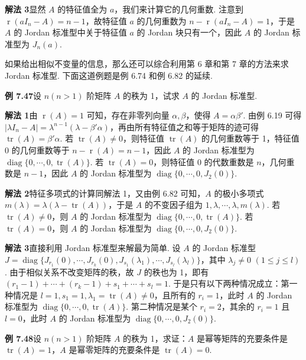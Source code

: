\documentclass[UTF8,12pt,a4paper,fontset=fandol]{ctexart}
\begin{document}
\noindent\textbf{解法 3}\quad 显然 $A$ 的特征值全为 $a$，我们来计算它的几何重数. 注意到 $\operatorname{r}(aI_n-A)=n-1$，故特征值 $a$ 的几何重数为 $n-\operatorname{r}(aI_n-A)=1$，于是 $A$ 的 Jordan 标准型中关于特征值 $a$ 的 Jordan 块只有一个，因此 $A$ 的 Jordan 标准型为 $J_n(a)$.

如果给出相似不变量的信息，那么还可以综合利用第 6 章和第 7 章的方法来求 Jordan 标准型. 下面这道例题是例 6.74 和例 6.82 的延续.

\noindent\textbf{例 7.47}\quad 设 $n(n>1)$ 阶矩阵 $A$ 的秩为 1，试求 $A$ 的 Jordan 标准型.

\noindent\textbf{解法 1}\quad 由 $\operatorname{r}(A)=1$ 可知，存在非零列向量 $\alpha,\beta$，使得 $A=\alpha\beta'$. 由例 6.19 可得 $|\lambda I_n-A|=\lambda^{n-1}(\lambda-\beta'\alpha)$，再由所有特征值之和等于矩阵的迹可得 $\operatorname{tr}(A)=\beta'\alpha$. 若 $\operatorname{tr}(A)\ne 0$，则特征值 $\operatorname{tr}(A)$ 的几何重数等于 1，特征值 $0$ 的几何重数等于 $n-\operatorname{r}(A)=n-1$，因此 $A$ 的 Jordan 标准型为 $\operatorname{diag}\{0,\cdots,0,\operatorname{tr}(A)\}$. 若 $\operatorname{tr}(A)=0$，则特征值 $0$ 的代数重数是 $n$，几何重数是 $n-1$，因此 $A$ 的 Jordan 标准型为 $\operatorname{diag}\{0,\cdots,0,J_2(0)\}$.

\noindent\textbf{解法 2}\quad 特征多项式的计算同解法 1，又由例 6.82 可知，$A$ 的极小多项式 $m(\lambda)=\lambda(\lambda-\operatorname{tr}(A))$，于是 $A$ 的不变因子组为 $1,\lambda,\cdots,\lambda,m(\lambda)$. 若 $\operatorname{tr}(A)\ne 0$，则 $A$ 的 Jordan 标准型为 $\operatorname{diag}\{0,\cdots,0,\operatorname{tr}(A)\}$. 若 $\operatorname{tr}(A)=0$，则 $A$ 的 Jordan 标准型为 $\operatorname{diag}\{0,\cdots,0,J_2(0)\}$.

\noindent\textbf{解法 3}\quad 直接利用 Jordan 标准型来解最为简单. 设 $A$ 的 Jordan 标准型 $J=\operatorname{diag}\{J_{r_1}(0),\cdots,J_{r_k}(0),J_{s_1}(\lambda_1),\cdots,J_{s_l}(\lambda_l)\}$，其中 $\lambda_j\ne 0$ $(1\le j\le l)$. 由于相似关系不改变矩阵的秩，故 $J$ 的秩也为 1，即有 $(r_1-1)+\cdots+(r_k-1)+s_1+\cdots+s_l=1$. 于是只有以下两种情况成立：第一种情况是 $l=1,s_1=1,\lambda_1=\operatorname{tr}(A)\ne 0$，且所有的 $r_i=1$，此时 $A$ 的 Jordan 标准型为 $\operatorname{diag}\{0,\cdots,0,\operatorname{tr}(A)\}$. 第二种情况是某个 $r_i=2$，其余的 $r_i=1$ 且 $l=0$，此时 $A$ 的 Jordan 标准型为 $\operatorname{diag}\{0,\cdots,0,J_2(0)\}$.

\noindent\textbf{例 7.48}\quad 设 $n(n>1)$ 阶矩阵 $A$ 的秩为 1，求证：$A$ 是幂等矩阵的充要条件是 $\operatorname{tr}(A)=1$，$A$ 是幂零矩阵的充要条件是 $\operatorname{tr}(A)=0$.
\end{document}
